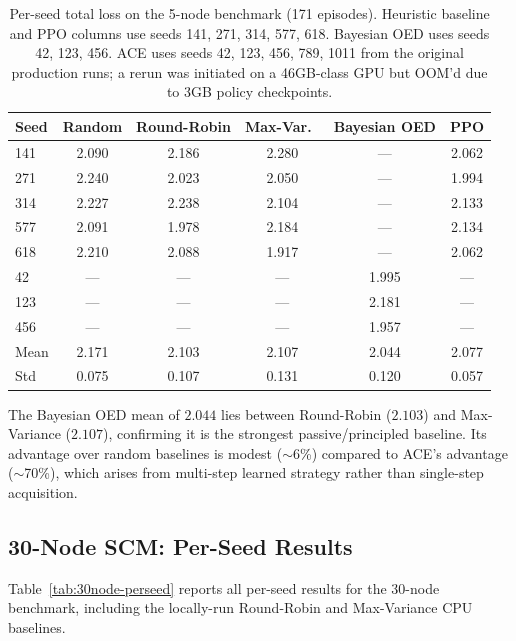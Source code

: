 \begin{table}[h]
\centering
\caption{Per-seed total loss on the 5-node benchmark (171 episodes). Heuristic baseline and PPO columns use seeds 141, 271, 314, 577, 618. Bayesian OED uses seeds 42, 123, 456. ACE uses seeds 42, 123, 456, 789, 1011 from the original production runs; a rerun was initiated on a 46GB-class GPU but OOM'd due to 3GB policy checkpoints.}
\label{tab:5node-perseed}
\small
\begin{tabular}{@{}l ccc cc@{}}
\toprule
Seed & Random & Round-Robin & Max-Var.\ & Bayesian OED & PPO \\
\midrule
141 & 2.090 & 2.186 & 2.280 & ---   & 2.062 \\
271 & 2.240 & 2.023 & 2.050 & ---   & 1.994 \\
314 & 2.227 & 2.238 & 2.104 & ---   & 2.133 \\
577 & 2.091 & 1.978 & 2.184 & ---   & 2.134 \\
618 & 2.210 & 2.088 & 1.917 & ---   & 2.062 \\
42  & ---   & ---   & ---   & 1.995 & ---   \\
123 & ---   & ---   & ---   & 2.181 & ---   \\
456 & ---   & ---   & ---   & 1.957 & ---   \\
\midrule
Mean & 2.171 & 2.103 & 2.107 & 2.044 & 2.077 \\
Std  & 0.075 & 0.107 & 0.131 & 0.120 & 0.057 \\
\bottomrule
\end{tabular}
\end{table}

The Bayesian OED mean of $2.044$ lies between Round-Robin ($2.103$) and Max-Variance ($2.107$), confirming it is the strongest passive/principled baseline. Its advantage over random baselines is modest ($\sim$6\%) compared to ACE's advantage ($\sim$70\%), which arises from multi-step learned strategy rather than single-step acquisition.

\subsection{30-Node SCM: Per-Seed Results}
\label{app:30node-detail}

Table~\ref{tab:30node-perseed} reports all per-seed results for the 30-node benchmark, including the locally-run Round-Robin and Max-Variance CPU baselines.

